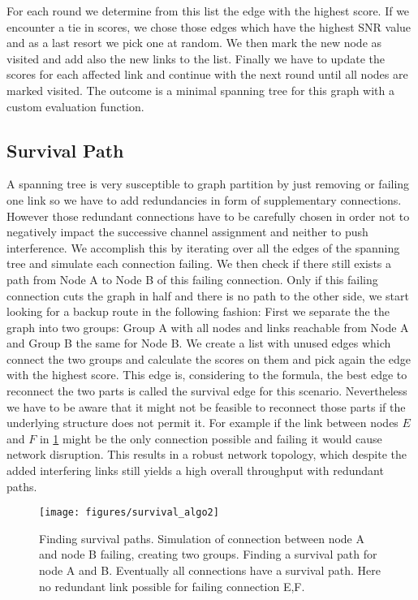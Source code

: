   For each round we determine from this list the edge with the highest score. If we encounter a tie in scores, we chose those edges which have the highest SNR value and as a last
  resort we pick one at random. We then mark the new node as visited and add also the new links to the list.
  Finally we have to update the scores for each affected link and continue with the next round until all nodes are marked visited.
  The outcome is a minimal spanning tree for this graph with a custom evaluation function.
  \subsection{Survival Path}
  A spanning tree is very susceptible to graph partition by just removing or failing one link so we have to add redundancies in form of supplementary connections.
  However those redundant connections have to be carefully chosen in order not to negatively impact the successive channel assignment and neither to push interference.
  We accomplish this by iterating over all the edges of the spanning tree and simulate each connection failing. We then check if there still exists 
  a path from Node A to Node B of this failing connection. Only if this failing connection cuts the graph in half and there is no path to the other side,
  we start looking for a backup route in the following fashion:
  First we separate the the graph into two groups: Group A with all nodes and links reachable from Node A and Group B the same for Node B.
  We create a list with unused edges which connect the two groups and calculate the scores on them and pick again the edge with the highest score.
  This edge is, considering to the formula, the best edge to reconnect the two parts is called the survival edge for this scenario.
  Nevertheless we have to be aware that it might not be feasible to reconnect those parts if the underlying structure does not permit it.
  For example if the link between nodes \(E\) and \(F\) in \ref{fig:survival_algo} might be the only connection possible and failing it would cause network disruption.
  This results in a robust network topology, which despite the added interfering links still yields a high overall throughput with redundant paths.
  \begin{figure}[h]
    \centering
    \texttt{[image: figures/survival\_algo2]}
    \caption{Finding survival paths. Simulation of connection between node A and node B failing, creating two groups.
    Finding a survival path for node A and B. Eventually all connections have a survival path. Here no redundant link possible for failing connection E,F.}
    \label{fig:survival_algo}
  \end{figure}
